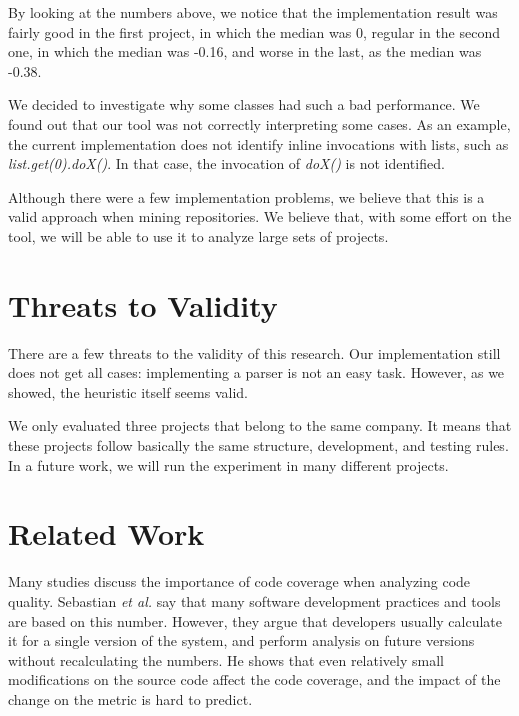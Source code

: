 \documentclass{sig-alternate}
\begin{document}
By looking at the numbers above, we notice that the implementation result was fairly good in the first project, in which the median was 0, regular in the second one, in which the median was -0.16, and worse in the last, as the median was -0.38.

We decided to investigate why some classes had such a bad performance. We found out
that our tool was not correctly interpreting some cases. As an example, 
the current implementation does not identify inline invocations with lists, such
as \textit{list.get(0).doX()}. In that case, the invocation of \textit{doX()} is not identified.

Although there were a few implementation problems, we believe that this is a valid approach
when mining repositories. We believe that, with some effort on the tool,
we will be able to use it to analyze large sets of projects.


\section{Threats to Validity}
\label{sec-threats}

There are a few threats to the validity of this research. Our implementation still does not get all cases: implementing a parser is not an easy task. However, as we showed, the 
heuristic itself seems valid.

We only evaluated three projects that belong to the same company. It means that these projects
follow basically the same structure, development, and testing rules. In a future work, we will run the experiment in many different projects.

\section{Related Work}
\label{sec-related-work}

Many studies discuss the importance of code coverage when analyzing code quality. 
Sebastian \textit{et al.} \cite{sebastian} say that many software development practices and tools
are based on this number. However, they argue that developers usually calculate it for a single
version of the system, and perform analysis on future versions without recalculating the numbers.
He shows that even relatively small modifications on the source code affect the code coverage, and the impact of the change on the metric is hard to predict.
\end{document}
